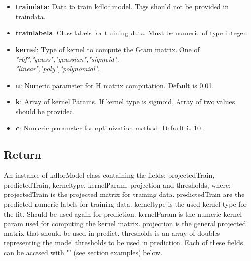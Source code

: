 \hline
\vspace{5pt}
\begin{itemize}
	\item \textbf{traindata}: Data to train kdlor model. Tags should not be provided in traindata.
	
	\item \textbf{trainlabels}: Class labels for training data. Must be numeric of type integer.
	
	\item \textbf{kernel}: Type of kernel to compute the Gram matrix. One of \textit{"rbf","gauss","gaussian","sigmoid", \\"linear","poly","polynomial"}.
	
	\item \textbf{u}: Numeric parameter for H matrix computation. Default is 0.01.
	
	\item \textbf{k}: Array of kernel Params. If kernel type is sigmoid, Array of two values should be provided.
	
	\item \textbf{c}: Numeric parameter for optimization method. Default is 10..
	
	\vspace{5pt}
	\hline
\end{itemize}

\subsection{Return}
An instance of kdlorModel class containing the fields: projectedTrain, predictedTrain, kerneltype, kernelParam, projection and thresholds, where: \newline
projectedTrain is the projected matrix for training data. \newline
predictedTrain are the predicted numeric labels for training data. \newline
kerneltype is the used kernel type for the fit. Should be used again for prediction.\newline
kernelParam is the numeric kernel param used for computing the kernel matrix.\newline
projection is the general projected matrix that should be used in predict.\newline
thresholds is an array of doubles representing the model thresholds to be used in prediction.\newline
Each of these fields can be accesed with "\@" (see section examples) below.
